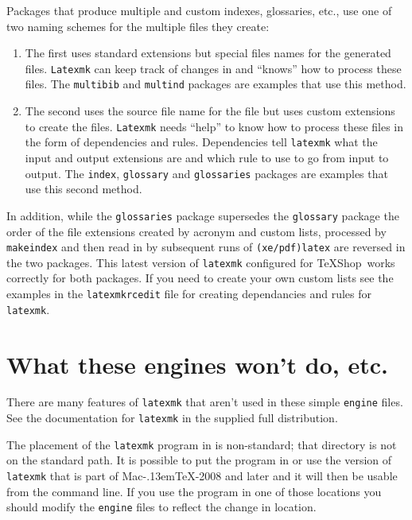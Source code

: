 \documentclass[11pt]{article}
\newcommand{\MacTeX}{Mac\kern-.13em\TeX}
\newcommand{\TS}{\textsf{\TeX Shop}}
\begin{document}
Packages that produce multiple and custom indexes, glossaries, etc., use one of two naming schemes for the multiple files they create:
\begin{enumerate}
\item
The first uses standard extensions but special files names for the generated files. \texttt{Latexmk} can keep track of changes in and ``knows'' how to process these files. The \texttt{multibib} and \texttt{multind} packages are examples that use this method.
\item
The second uses the source file name for the file but uses custom extensions to create the files. \texttt{Latexmk} needs ``help'' to know how to process these files in the form of dependencies and rules. Dependencies tell \texttt{latexmk} what the input and output extensions are and which rule to use to go from input to output. The \texttt{index}, \texttt{glossary} and \texttt{glossaries} packages are examples that use this second method.
\end{enumerate}

In addition, while the \texttt{glossaries} package supersedes the \texttt{glossary} package the order of the file extensions created by acronym and custom lists, processed by \texttt{makeindex} and then read in by subsequent runs of \texttt{(xe/pdf)latex} are reversed in the two packages. This latest version of \texttt{latexmk} configured for \TS\ works correctly for both packages. If you need to create your own custom lists see the examples in the \texttt{latexmkrcedit} file for creating dependancies and rules for \texttt{latexmk}.

\section{What these engines won't do, etc.}

There are many features of \texttt{latexmk} that aren't used in these simple \texttt{engine} files. See the documentation for \texttt{latexmk} in the supplied full distribution.

The placement of the \texttt{latexmk} program in  is non-standard; that directory is not on the standard path. It is possible to put the program in  or use the version of \texttt{latexmk} that is part of \MacTeX-2008 and later and it will then be usable from the command line. If you use the program in one of those locations you should modify the \texttt{engine} files to reflect the change in location.
\end{document}
